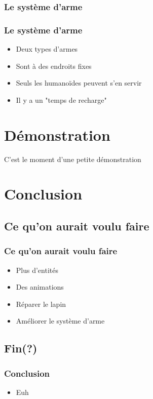 \documentclass{beamer}
\begin{document}
\subsubsection{Le système d'arme}

\begin{frame} \frametitle{Le système d'arme}
	\begin{itemize}
		\item Deux types d'armes
		\item Sont à des endroits fixes
		\item Seuls les humanoïdes peuvent s'en servir
		\item Il y a un "temps de recharge"
	\end{itemize}
\end{frame}

\section{Démonstration}

\begin{frame}
	\begin{large}
		\begin{center}
			C'est le moment d'une petite démonstration
		\end{center}
	\end{large}
\end{frame}

\section{Conclusion}
\subsection{Ce qu'on aurait voulu faire}

\begin{frame} \frametitle{Ce qu'on aurait voulu faire}
	\begin{itemize}
		\item Plus d'entités
		\item Des animations
		\item Réparer le lapin
		\item Améliorer le système d'arme
	\end{itemize}
\end{frame}

\subsection{Fin(?)}

\begin{frame} \frametitle{Conclusion}
	\begin{itemize}
		\item Euh
	\end{itemize}
\end{frame}
\end{document}
